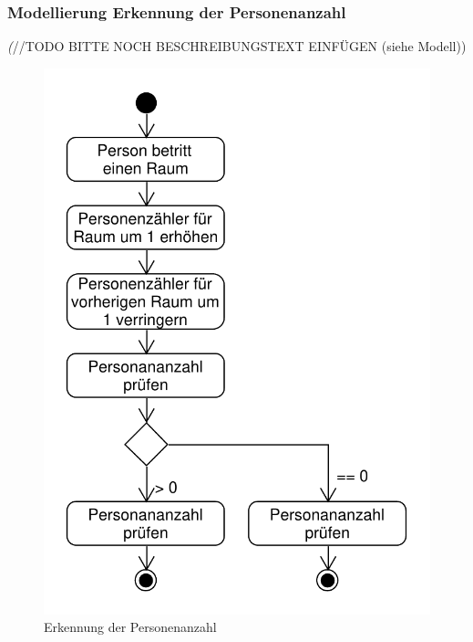 \subsubsection{Modellierung Erkennung der Personenanzahl}
\emph(//TODO BITTE NOCH BESCHREIBUNGSTEXT EINFÜGEN (siehe Modell))
\begin{figure}[h!]
	\centering
	\includegraphics[scale=0.8]{img/Szenarien/ErkennungAnzahlPersonen.pdf}
	\caption{Erkennung der Personenanzahl}
	\label{fig:szenarienPersonenerkennung}
\end{figure}

